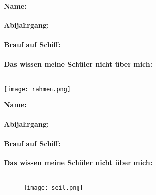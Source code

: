 \begin{minipage}[t][0.28\textheight][t]{\linewidth}
    \ifodd\profnum
	\begin{minipage}[c]{0.79\textwidth}
		\textbf{Name:}\\ \profname\\
		\textbf{Abijahrgang:}\\ \profabi\\
		\textbf{Brauf auf Schiff:}\\ \profprof\\
		\textbf{Das wissen meine Schüler nicht über mich:}\\ \profsecret\\
	\end{minipage}
    \fi
	\begin{minipage}[c]{0.2\textwidth}
		\texttt{[image: rahmen.png]}
	\end{minipage}
    \ifodd\profnum\else
    \hspace*{.5cm}%
	\begin{minipage}[c]{0.79\textwidth}
		\textbf{Name:}\\ \profname\\
		\textbf{Abijahrgang:}\\ \profabi\\
		\textbf{Brauf auf Schiff:}\\ \profprof\\
		\textbf{Das wissen meine Schüler nicht über mich:}\\ \profsecret\\
	\end{minipage}
    \fi

\end{minipage}

\begin{figure}[H]
	\hspace*{-1.5cm}\texttt{[image: seil.png]}
\end{figure}
